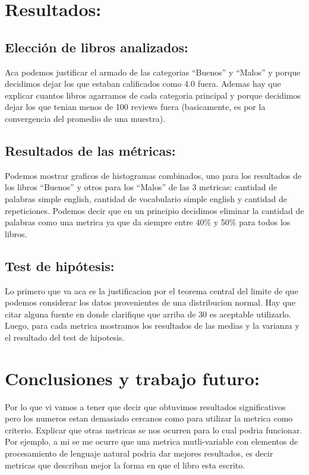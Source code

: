 \documentclass[12pt,journal,compsoc]{IEEEtran}
\begin{document}
\section{Resultados:}
\subsection{Elección de libros analizados:} Aca podemos justificar el armado de las categorias ``Buenos'' y ``Malos'' y porque decidimos dejar los que estaban calificados como 4.0 fuera. Ademas hay que explicar cuantos libros agarramos de cada categoria principal y porque decidimos dejar los que tenian menos de 100 reviews fuera (basicamente, es por la convergencia del promedio de una muestra). \subsection{Resultados de las métricas:} Podemos mostrar graficos de histogramas combinados, uno para los resultados de los libros ``Buenos'' y otros para los ``Malos'' de las 3 metricas: cantidad de palabras simple english, cantidad de vocabulario simple english y cantidad de repeticiones. Podemos decir que en un principio decidimos eliminar la cantidad de palabras como una metrica ya que da siempre entre 40\% y 50\% para todos los libros.\\

\subsection{Test de hipótesis:} Lo primero que va aca es la justificacion por el teorema central del limite de que podemos considerar los datos provenientes de una distribucion normal. Hay que citar alguna fuente en donde clarifique que arriba de 30 es aceptable utilizarlo. Luego, para cada metrica mostramos los resultados de las medias y la varianza y el resultado del test de hipotesis.

\section{Conclusiones y trabajo futuro:} Por lo que vi vamos a tener que decir que obtuvimos resultados significativos pero los numeros estan demasiado cercanos como para utilizar la metrica como criterio. Explicar que otras metricas se nos ocurren para lo cual podria funcionar. Por ejemplo, a mi se me ocurre que una metrica mutli-variable con elementos de procesamiento de lenguaje natural podria dar mejores resultados, es decir metricas que describan mejor la forma en que el libro esta escrito.\\
\end{document}
